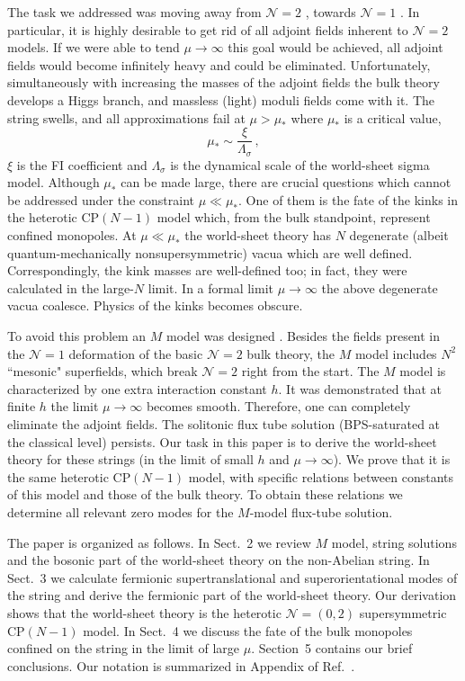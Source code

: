 \documentclass[12pt]{article}
\def\beq{\begin{equation}}
\def\eeq{\end{equation}}
\newcommand{\ntwo}{${\mathcal N}=2$ }
\newcommand{\ntwoo}{${\mathcal N}= \left(0,2\right) $ }
\newcommand{\none}{${\mathcal N}=1$ }
\begin{document}
The task we addressed was moving away from \ntwo$\!\!$, towards \none$\!\!$.
In particular, it is highly desirable to get rid of all adjoint fields
inherent to \ntwo models.  If we were able to tend $\mu\to\infty$ this goal would be achieved,
all adjoint fields would become infinitely heavy and could be eliminated. Unfortunately,
simultaneously with increasing the masses of the adjoint fields the bulk theory develops 
a Higgs branch, and massless (light) moduli fields come with it. The string swells,
and all approximations fail at $\mu >\mu_*$ where $\mu_*$ is a critical value,
\beq
\mu_* \sim \frac{\xi}{\Lambda_\sigma}\,,
\label{critmu}
\eeq
$\xi$ is the FI coefficient and $\Lambda_\sigma$ is the dynamical scale
of the world-sheet sigma model.
Although $\mu_*$ can be made large, there are crucial questions which cannot be addressed
under the constraint $\mu \ll \mu_*$. One of them is the fate of the kinks in the heterotic
CP$(N-1)$ model which, from the bulk standpoint, represent confined monopoles.
At $\mu \ll \mu_*$ the world-sheet theory has $N$ degenerate (albeit quantum-mechanically nonsupersymmetric) vacua
which are well defined. Correspondingly, the kink masses are well-defined too;
in fact, they were calculated \cite{SYhet2} in the large-$N$ limit. In a formal limit $\mu\to\infty$
the above degenerate vacua coalesce. Physics of the kinks becomes obscure.

To avoid this problem an $M$ model was designed \cite{GSYmmodel}. Besides the fields present in the
\none deformation of the basic \ntwo bulk theory, the $M$ model includes $N^2$
``mesonic" superfields, which break \ntwo right from the start. The $M$ model is characterized by one
extra interaction constant $h$. 
It was demonstrated \cite{GSYmmodel} that at finite $h$ the limit $\mu\to\infty$ becomes smooth.
Therefore, one can completely eliminate the adjoint fields.
The solitonic flux tube solution (BPS-saturated at the classical level) persists.  
Our task in this paper is to derive the world-sheet theory for these strings (in the limit of
small $h$ and $\mu\to\infty$). We prove that it is the same heterotic
CP$(N-1)$ model, with specific relations between constants of this model and those of the bulk theory.
To obtain these relations we determine all relevant zero modes for the $M$-model flux-tube solution.





The paper is organized as follows. In Sect.~2 we review $M$ model, string solutions and 
the bosonic part of the world-sheet theory on the non-Abelian string. In Sect.~3 we calculate
fermionic supertranslational and superorientational modes of the string and derive
the fermionic part of the world-sheet theory. Our derivation shows that the world-sheet theory is
the  heterotic \ntwoo supersymmetric CP$(N-1)$ model. In Sect.~4 we discuss the fate of
the  bulk monopoles
confined on the string in the limit of large $\mu$. Section~5 contains our brief conclusions.
Our notation is summarized  in Appendix of Ref.~\cite{BSYhet}.
\end{document}
